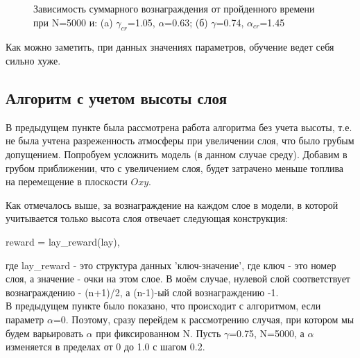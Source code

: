\documentclass[a4paper]{report}
\theoremstyle{definition}
\theoremstyle{plain}
\theoremstyle{remark}
\theoremstyle{remark}
\theoremstyle{definition}
\begin{document}
\begin{figure}[H]
\begin{minipage}[H]{0.49\linewidth}
    \end{minipage}
     \caption{Зависимость суммарного вознаграждения от пройденного времени при N=5000 и: (a) $\gamma_{cr}$=1.05, $\alpha$=0.63; (б) $\gamma$=0.74, $\alpha_{cr}$=1.45}
\end{figure}
Как можно заметить, при данных значениях параметров, обучение ведет себя сильно хуже.
\\
\begin{center}
    \subsection{Алгоритм с учетом высоты слоя}
\end{center}

В предыдущем пункте была рассмотрена работа алгоритма без учета высоты, т.е. не была учтена разреженность атмосферы при увеличении слоя, что было грубым допущением. Попробуем усложнить модель (в данном случае среду). Добавим в грубом приближении, что с увеличением слоя, будет затрачено меньше топлива на перемещение в плоскости $Oxy$. 

Как отмечалось выше, за вознаграждение на каждом слое в модели, в которой учитывается только высота слоя отвечает следующая конструкция:
\begin{center}
    reward = lay\_reward(lay),
\end{center}
где lay\_reward - это структура данных 'ключ-значение', где ключ - это номер слоя, а значение - очки на этом слое. В моём случае, нулевой слой соответствует вознаграждению - (n+1)/2, а (n-1)-ый слой вознаграждению -1.
\\
В предыдущем пункте было показано, что происходит с алгоритмом, если параметр $\alpha$=0. Поэтому, сразу перейдем к рассмотрению случая, при котором мы будем варьировать $\alpha$ при фиксированном N. Пусть $\gamma$=0.75, N=5000, а $\alpha$ изменяется в пределах от 0 до 1.0 с шагом 0.2.
\end{document}
